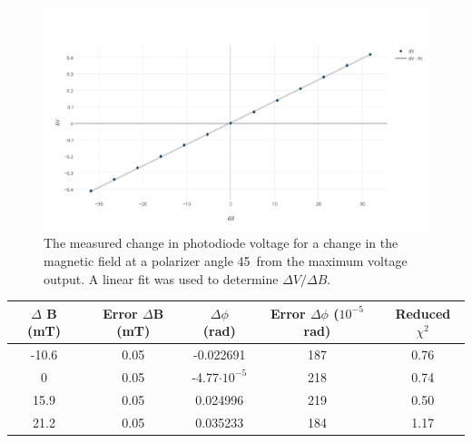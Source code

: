 \documentclass[prb,preprint]{revtex4-1}
\begin{document}
{\begin{figure}[b]
\includegraphics[width =6.3in]{verdetpic2.pdf}
\caption{\label{method2pic} The measured change in photodiode voltage for a change in the magnetic field at a polarizer angle 45\degree\  from the maximum voltage output. A linear fit was used to determine $\Delta V/\Delta B$.}
\end{figure}
}

\begin{ruledtabular}
\begin{tabular}{ccccc}
$\Delta$ B (mT) & Error $\Delta$B (mT)& $\Delta \phi$ (rad) & Error $\Delta\phi$ ($10^{-5}$ rad) & Reduced $\chi^2$ \\  \hline
-10.6 & 0.05 & -0.022691 & 187 & 0.76 \\
0     & 0.05 & -4.77$\cdot10^{-5}$ & 218 & 0.74 \\
15.9  & 0.05 & 0.024996  & 219 & 0.50 \\
21.2  & 0.05 & 0.035233  & 184 & 1.17
\end{tabular}
\end{ruledtabular}
\end{document}
